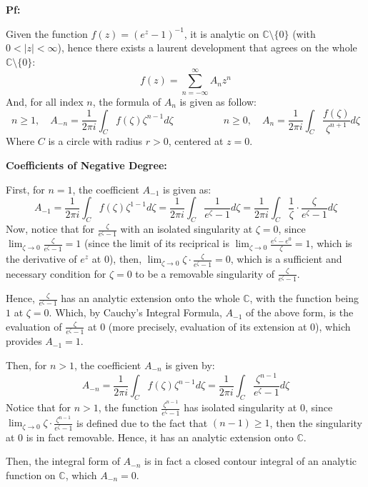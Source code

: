\documentclass{article}
\begin{document}
\textbf{Pf:}

Given the function $f(z)=(e^z-1)^{-1}$, it is analytic on $\mathbb{C}\setminus\{0\}$ (with $0<|z|<\infty$), hence there exists a laurent development that agrees on the whole $\mathbb{C}\setminus\{0\}$:
$$f(z)=\sum_{n=-\infty}^{\infty}A_nz^n$$
And, for all index $n$, the formula of $A_n$ is given as follow:
$$n\geq 1,\quad A_{-n}=\frac{1}{2\pi i}\int_{C}f(\zeta)\zeta^{n-1}d\zeta\quad \quad \quad \quad \quad n\geq 0,\quad A_n=\frac{1}{2\pi i}\int_{C}\frac{f(\zeta)}{\zeta^{n+1}}d\zeta$$
Where $C$ is a circle with radius $r>0$, centered at $z=0$.

\hfil

\textbf{Coefficients of Negative Degree:}

First, for $n=1$, the coefficient $A_{-1}$ is given as:
$$A_{-1}=\frac{1}{2\pi i}\int_{C}f(\zeta)\zeta^{1-1}d\zeta = \frac{1}{2\pi i}\int_{C}\frac{1}{e^{\zeta}-1}d\zeta=\frac{1}{2\pi i}\int_{C}\frac{1}{\zeta}\cdot\frac{\zeta}{e^{\zeta}-1}d\zeta$$
Now, notice that for $\frac{\zeta}{e^\zeta-1}$ with an isolated singularity at $\zeta=0$, since $\lim_{\zeta\rightarrow 0}\frac{\zeta}{e^\zeta-1}=1$ (since the limit of its reciprical is $\lim_{\zeta\rightarrow 0}\frac{e^\zeta-e^0}{\zeta}=1$, 
which is the derivative of $e^z$ at $0$),
then, $\lim_{\zeta\rightarrow 0}\zeta \cdot \frac{\zeta}{e^{\zeta}-1}=0$, which is a sufficient and necessary condition for $\zeta=0$ to be a removable singularity of $\frac{\zeta}{e^{\zeta}-1}$.

Hence, $\frac{\zeta}{e^\zeta-1}$ has an analytic extension onto the whole $\mathbb{C}$, with the function being $1$ at $\zeta=0$. Which, by Cauchy's Integral Formula, $A_{-1}$ of the above form, is the evaluation of $\frac{\zeta}{e^\zeta-1}$ at $0$ (more precisely, evaluation of its extension at $0$),
which provides $A_{-1}=1$.

\hfil

Then, for $n>1$, the coefficient $A_{-n}$ is given by:
$$A_{-n}=\frac{1}{2\pi i}\int_{C}f(\zeta)\zeta^{n-1}d\zeta=\frac{1}{2\pi i}\int_{C}\frac{\zeta^{n-1}}{e^\zeta-1}d\zeta$$
Notice that for $n>1$, the function $\frac{\zeta^{n-1}}{e^\zeta-1}$ has isolated singularity at $0$, since $\lim_{\zeta\rightarrow 0}\zeta\cdot \frac{\zeta^{n-1}}{e^\zeta-1}$ is defined due to the fact that $(n-1)\geq 1$, then the singularity at $0$ is in fact removable.
Hence, it has an analytic extension onto $\mathbb{C}$.

Then, the integral form of $A_{-n}$ is in fact a closed contour integral of an analytic function on $\mathbb{C}$, which $A_{-n}=0$.
\end{document}
